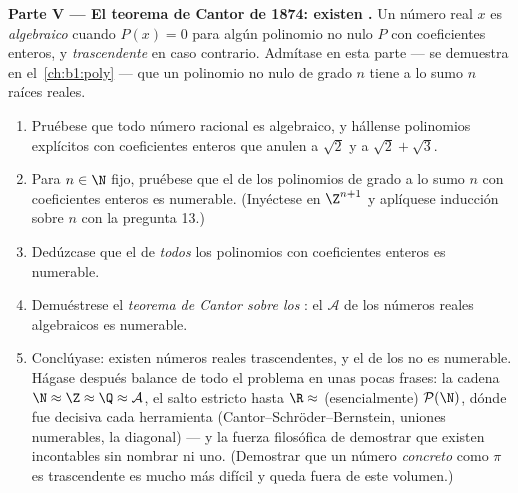 \begin{problem}
\medskip
\noindent\textbf{Parte V --- El teorema de Cantor de 1874: existen
.} Un número real $x$ es \emph{algebraico}
 cuando $P(x) = 0$ para algún polinomio no nulo
$P$ con coeficientes enteros, y \emph{trascendente}
 en caso contrario. Admítase en esta parte
--- se demuestra en el~\cref{ch:b1:poly} --- que un polinomio no nulo de
grado $n$ tiene a lo sumo $n$ raíces reales.
\begin{enumerate}[resume]
  \item Pruébese que todo número racional es algebraico, y hállense
        polinomios explícitos con coeficientes enteros que anulen a
        $\sqrt 2$ y a $\sqrt 2 + \sqrt 3$.
  \item Para $n \in \N$ fijo, pruébese que el  de los polinomios
        de grado a lo sumo $n$ con coeficientes enteros es numerable.
        (Inyéctese en $\Z^{n+1}$ y aplíquese inducción sobre $n$ con la
        pregunta 13.)
  \item Dedúzcase que el  de \emph{todos} los polinomios con
        coeficientes enteros es numerable.
  \item Demuéstrese el \emph{teorema de Cantor sobre los
        }: el  $\mathcal{A}$ de los números
        reales algebraicos es numerable.
  \item Conclúyase: existen números reales trascendentes, y el
         de los  no es numerable. Hágase
        después balance de todo el problema en unas pocas frases: la
        cadena $\N \approx \Z \approx \Q \approx \mathcal{A}$, el salto
        estricto hasta $\R \approx$ (esencialmente) $\mathcal{P}(\N)$,
        dónde fue decisiva cada herramienta
        (Cantor--Schröder--Bernstein, uniones numerables, la diagonal)
        --- y la fuerza filosófica de demostrar que existen incontables
         sin nombrar ni uno. (Demostrar que un
        número \emph{concreto} como $\pi$ es trascendente es mucho más
        difícil y queda fuera de este volumen.)
\end{enumerate}
\end{problem}
